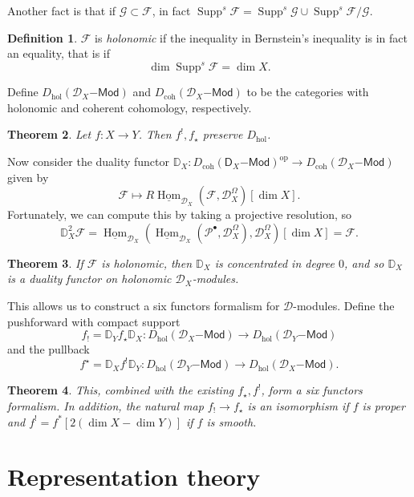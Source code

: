 \documentclass[leqno, openany]{memoir}
\newtheorem{thm}{Theorem}[section]
\theoremstyle{definition}
\newtheorem{defn}[thm]{Definition}
\theoremstyle{remark}
\theoremstyle{plain}
\theoremstyle{definition}
\theoremstyle{remark}
\newcommand{\mc}[1]{\mathcal{#1}}
\newcommand{\mr}[1]{\mathrm{#1}}
\newcommand{\ms}[1]{\mathsf{#1}}
\newcommand{\ul}[1]{\underline{#1}}
\DeclareMathOperator{\Hom}{Hom}
\DeclareMathOperator{\Supp}{Supp}
\begin{document}
Another fact is that if $\mc{G} \subset \mc{F}$, in fact $\Supp^s \mc{F} = \Supp^s \mc{G} \cup \Supp^s \mc{F}/\mc{G}$.

\begin{defn}
    $\mc{F}$ is \textit{holonomic} if the inequality in Bernstein's inequality is in fact an equality, that is if
    \[ \dim \Supp^s \mc{F} = \dim X. \]
\end{defn}

Define $D_{\mr{hol}}(\mc{D}_X\ms{-Mod})$ and $D_{\mr{coh}}(\mc{D}_X\ms{-Mod})$ to be the categories with holonomic and coherent cohomology, respectively.

\begin{thm}
    Let $f \colon X \to Y$. Then $f^!, f_{\star}$ preserve $D_{\mr{hol}}$.
\end{thm}

Now consider the duality functor $\mathbb{D}_X \colon D_{\mr{coh}}(\ms{D}_X\ms{-Mod})^{\mr{op}} \to D_{\mr{coh}}(\mc{D}_X\ms{-Mod})$ given by
\[ \mc{F} \mapsto R \ul{\Hom}_{\mc{D}_X}(\mc{F}, \mc{D}_X^{\Omega})[\dim X]. \]
Fortunately, we can compute this by taking a projective resolution, so
\[ \mathbb{D}_X^2 \mc{F} = \ul{\Hom}_{\mc{D}_X} (\ul{\Hom}_{\mc{D}_X}(\mc{P}^{\bullet}, \mc{D}_X^{\Omega}), \mc{D}_X^{\Omega})[\dim X] = \mc{F}. \]

\begin{thm}
    If $\mc{F}$ is holonomic, then $\mathbb{D}_X$ is concentrated in degree $0$, and so $\mathbb{D}_X$ is a duality functor on holonomic $\mc{D}_X$-modules.
\end{thm}

This allows us to construct a six functors formalism for $\mc{D}$-modules. Define the pushforward with compact support
\[ f_! = \mathbb{D}_Y f_{\star} \mathbb{D}_X \colon D_{\mr{hol}}(\mc{D}_X\ms{-Mod}) \to D_{\mr{hol}}(\mc{D}_Y\ms{-Mod}) \]
and the pullback
\[ f^{\star} = \mathbb{D}_X f^! \mathbb{D}_Y \colon D_{\mr{hol}}(\mc{D}_Y\ms{-Mod}) \to D_{\mr{hol}}(\mc{D}_X\ms{-Mod}). \]

\begin{thm}
    This, combined with the existing $f_{\star}, f^!$, form a six functors formalism. In addition, the natural map $f_! \to f_{\star}$ is an isomorphism if $f$ is proper and $f^! = f^* [2(\dim X - \dim Y)]$ if $f$ is smooth.
\end{thm}

\section{Representation theory}
\end{document}
